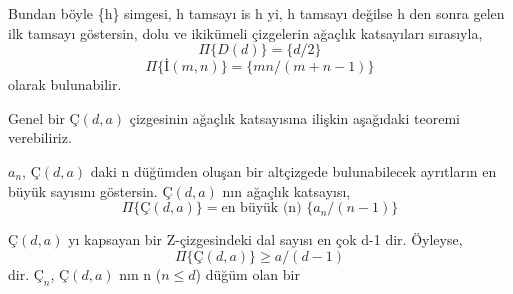 \documentclass[11pt]{amsbook}
\begin{document}

Bundan böyle \{h\} simgesi, h tamsayı is h yi, h tamsayı değilse h den sonra gelen ilk tamsayı göstersin, dolu ve ikikümeli çizgelerin ağaçlık katsayıları sırasıyla,
\[
	\Pi \{ D(d) \} = \{ d/2\}
\]
\[
	\Pi \{ \text{İ}(m,n)\} = \{ mn /(m+n-1)\}
\]
olarak bulunabilir.

Genel bir $Ç(d,a)$ çizgesinin ağaçlık katsayısına ilişkin aşağıdaki teoremi verebiliriz.

\begin{theorem}

	$a_n$, $Ç(d,a)$ daki n düğümden oluşan bir altçizgede bulunabilecek ayrıtların en büyük sayısını göstersin.  $Ç(d,a)$ nın ağaçlık katsayısı,
	\[
		\Pi \{Ç(d,a)\} =  \text{en büyük (n) } \{ a_n/(n-1)\}
	\]

\end{theorem}

\begin{definition}

	$Ç(d,a)$ yı kapsayan bir Z-çizgesindeki dal sayısı en çok d-1 dir. Öyleyse,
	\[
		\Pi \{Ç(d,a)\} \geq a/(d-1)
	\]
dir. $Ç_n$, $Ç(d,a)$ nın n ($n \leq d$) düğüm olan bir

\end{definition}
\end{document}
